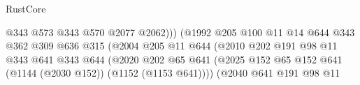 \begin{lexlean}{RustCore}
\begin{coremodule}
                                                    @343
                                                    @573
                                                    @343
                                                    @570
                                                    @2077
                                                    @2062)))
                                              (@1992
                                                @205
                                                @100
                                                @11
                                                @14
                                                @644
                                                @343
                                                @362
                                                @309
                                                @636
                                                @315
                                                (@2004
                                                  @205
                                                  @11
                                                  @644
                                                  (@2010
                                                    @202
                                                    @191
                                                    @98
                                                    @11
                                                    @343
                                                    @641
                                                    @343
                                                    @644
                                                    (@2020
                                                      @202
                                                      @65
                                                      @641
                                                      (@2025
                                                        @152
                                                        @65
                                                        @152
                                                        @641
                                                        (@1144 (@2030 @152))
                                                        (@1152 (@1153 @641))))
                                                    (@2040
                                                      @641
                                                      @191
                                                      @98
                                                      @11

\end{coremodule}
\end{lexlean}
